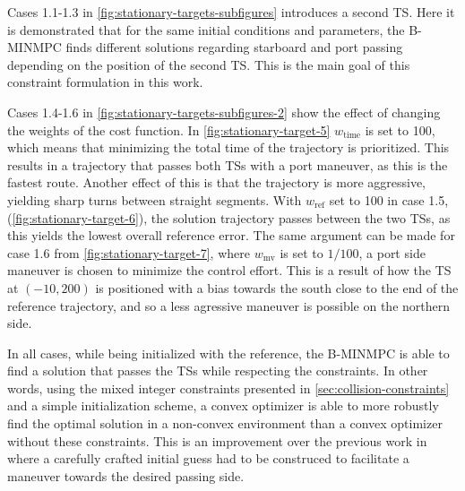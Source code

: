 Cases 1.1-1.3 in \cref{fig:stationary-targets-subfigures} introduces a second TS. Here it is demonstrated that for the same initial conditions and parameters, the B-MINMPC finds different solutions regarding starboard and port passing depending on the position of the second TS. This is the main goal of this constraint formulation in this work. 

Cases 1.4-1.6 in \cref{fig:stationary-targets-subfigures-2} show the effect of changing the weights of the cost function. In \cref{fig:stationary-target-5} $w_\text{time}$ is set to 100, which means that minimizing the total time of the trajectory is prioritized. This results in a trajectory that passes both TSs with a port maneuver, as this is the fastest route. Another effect of this is that the trajectory is more aggressive, yielding sharp turns between straight segments. With $w_\text{ref}$ set to 100 in case 1.5, (\cref{fig:stationary-target-6}), the solution trajectory passes between the two TSs, as this yields the lowest overall reference error. The same argument can be made for case 1.6 from \cref{fig:stationary-target-7}, where $w_\text{mv}$ is set to $1/100$, a port side maneuver is chosen to minimize the control effort. This is a result of how the TS at $(-10, 200)$ is positioned with a bias towards the south close to the end of the reference trajectory, and so a less agressive maneuver is possible on the northern side.

In all cases, while being initialized with the reference, the B-MINMPC is able to find a solution that passes the TSs while respecting the constraints. In other words, using the mixed integer constraints presented in \cref{sec:collision-constraints} and a simple initialization scheme, a convex optimizer is able to more robustly find the optimal solution in a non-convex environment than a convex optimizer without these constraints. This is an improvement over the previous work in \cite{Thyri2022-MPC,prosjektoppgave} where a carefully crafted initial guess had to be construced to facilitate a maneuver towards the desired passing side.


